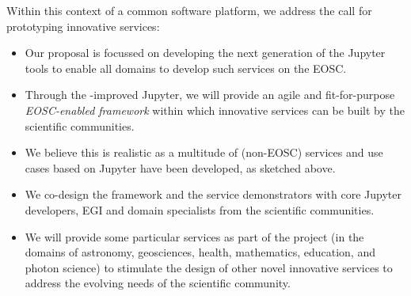 Within this context of a common software platform, we address the call
for prototyping innovative services:
\begin{itemize}
\item Our \TheProject proposal is focussed on developing the next generation
of the Jupyter tools to enable all domains to develop such services on
the EOSC.

\item Through the \TheProject-improved Jupyter, we will provide an
  agile and fit-for-purpose \emph{EOSC-enabled
framework} within which innovative services can be built by the
scientific communities.

\item We believe this is realistic as a multitude of (non-EOSC) services and
  use cases based on Jupyter have been developed, as sketched above.

\item We co-design the framework and the service demonstrators with
  core Jupyter developers, EGI and domain specialists from the
  scientific communities.

\item We will provide some particular services as part of the project
  (in the domains of astronomy, geosciences, health, mathematics, education, and photon
  science) to stimulate the design of other novel innovative services
  to address the evolving needs of the scientific community.
\end{itemize}
\bigskip


